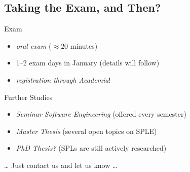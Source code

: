 \subsection{Taking the Exam, and Then?}

\begin{frame}{\myframetitle}
	\begin{fancycolumns}
		\begin{definition}{Exam}
			\begin{itemize}
				\item \emph{oral exam} ($\approx 20$ minutes)
				\item 1--2 exam days in January (details will follow)
				\item \emph{registration through Academia}!
			\end{itemize}
		\end{definition}
	\nextcolumn
		\begin{example}{Further Studies}
			\begin{itemize}
				\item \emph{Seminar Software Engineering} (offered every semester)
				\item \emph{Master Thesis} (several open topics on SPLE)
				\item \emph{PhD Thesis?} (SPLs are still actively researched)
			\end{itemize}
			\ldots{} Just contact us and let us know \ldots
		\end{example}
	\end{fancycolumns}
\end{frame}
